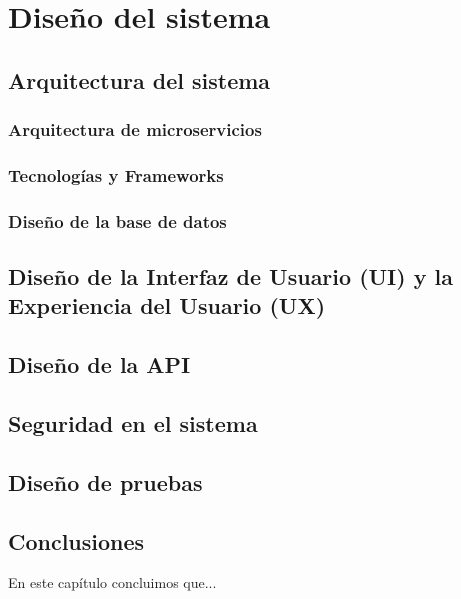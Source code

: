 \chapter{Diseño del sistema}\label{cap:disenio}

\section{Arquitectura del sistema}

\subsection{Arquitectura de microservicios}

\subsection{Tecnologías y Frameworks}

\subsection{Diseño de la base de datos}

\section{Diseño de la Interfaz de Usuario (UI) y la Experiencia del Usuario (UX)}

\section{Diseño de la API}

\section{Seguridad en el sistema}

\section{Diseño de pruebas}

\section{Conclusiones}
En este capítulo concluimos que...